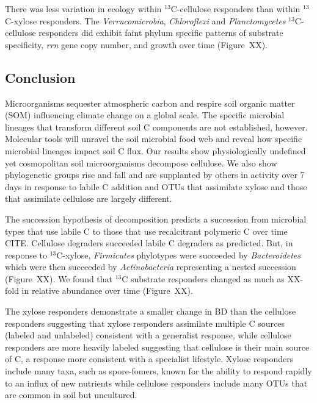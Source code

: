 There was less variation in ecology within $^{13}$C-cellulose responders than
within $^{13}$C-xylose responders. The \textit{Verrucomicrobia},
\textit{Chloroflexi} and \textit{Planctomycetes} $^{13}$C-cellulose responders
did exhibit faint phylum specific patterns of substrate specificity,
\textit{rrn} gene copy number, and growth over time (Figure~XX).

\subsection{Conclusion} 
Microorganisms sequester atmospheric carbon and respire soil organic matter
(SOM) influencing climate change on a global scale. The specific microbial
lineages that transform different soil C components are not established,
however. Molecular tools will unravel the soil microbial food web and reveal
how specific microbial lineages impact soil C flux. Our results show
physiologically undefined yet cosmopolitan soil microorganisms decompose
cellulose. We also show phylogenetic groups rise and fall and are supplanted by
others in activity over 7 days in response to labile C addition and OTUs that
assimilate xylose and those that assimilate cellulose are largely different. 

The succession hypothesis of decomposition predicts a succession from
microbial types that use labile C to those that use recalcitrant polymeric
C over time CITE. Cellulose degraders succeeded labile C degraders as
predicted. But, in response to $^{13}$C-xylose, \textit{Firmicutes}
phylotypes were succeeded by \textit{Bacteroidetes} which were then
succeeded by \textit{Actinobacteria} representing a nested succession
(Figure~XX). We found that $^{13}$C substrate responders changed as much as
XX-fold in relative abundance over time (Figure~XX). 

The xylose responders demonstrate a smaller change in BD than the
cellulose responders suggesting that xylose responders assimilate multiple C
sources (labeled and unlabeled) consistent with a generalist response, while
cellulose responders are more heavily labeled suggesting that cellulose is
their main source of C, a response more consistent with a specialist lifestyle.
Xylose responders include many taxa, such as spore-fomers, known for the
ability to respond rapidly to an influx of new nutrients while cellulose
responders include many OTUs that are common in soil but uncultured.
 
